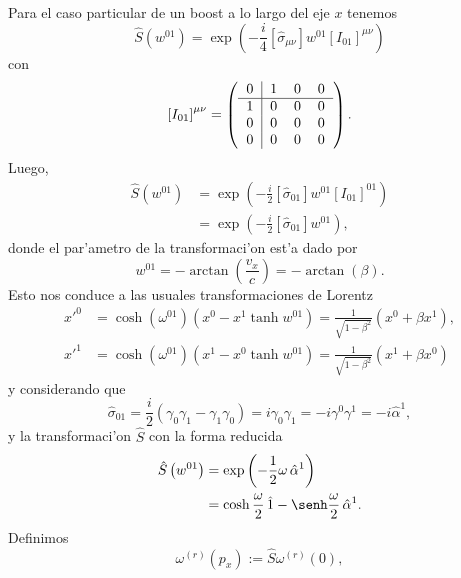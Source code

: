 Para el caso particular de un boost a lo largo del eje $x$ tenemos
\begin{equation}
\hat{S}\left( w^{01}\right) =\exp\left( -\frac{i}{4}\left[
\hat{\sigma}_{\mu\nu}\right]w^{01}\left[ I_{01}\right]
^{\mu\nu}\right)
\end{equation}
con
\begin{equation}
\left[ I_{01}\right]^{\mu\nu}=\left(
\begin{tabular}
[c]{l|lll}%
$0$ & $1$ & $0$ & $0$\\\hline
$1$ & $0$ & $0$ & $0$\\
$0$ & $0$ & $0$ & $0$\\
$0$ & $0$ & $0$ & $0$%
\end{tabular}
\right) .
\end{equation}
Luego,
\begin{align}
\hat{S}\left( w^{01}\right)  & =\exp\left( -\frac{i}{2}\left[
\hat{\sigma}_{01}\right]  w^{01}\left[
I_{01}\right]^{01}\right) \\
& =\exp\left( -\frac{i}{2}\left[ \hat{\sigma}_{01}\right] w^{01}\right),
\end{align}
donde el par'ametro de la transformaci'on est'a dado por
\begin{equation}
w^{01}=-\arctan\left( \frac{v_{x}}{c}\right)=-\arctan(\beta). \label{param}
\end{equation}
Esto nos conduce a las usuales transformaciones de Lorentz
\begin{align}
x'^0 & =\cosh(\omega^{01})\left( x^0-x^1\tanh w^{01}\right)
=\frac{1}{\sqrt{1-\beta^2}}\left( x^0+\beta x^1\right) ,\\
x'^1 & =\cosh(\omega^{01})\left( x^1-x^0\tanh w^{01}\right)
=\frac{1}{\sqrt{1-\beta^2}}\left( x^1+\beta x^0\right)
\end{align}
y considerando que
\begin{equation}
\hat{\sigma}_{01}=\frac{i}{2}\left( \gamma_0\gamma_{1}-\gamma_{1}\gamma
_0\right) =i\gamma_0\gamma_{1}=-i\gamma^0\gamma^1=-i\hat{\alpha}^1,
\end{equation}
y la transformaci'on $\hat{S}$ con la forma reducida
\begin{align}
\hat{S} \left( w^{01}\right)  & =\exp\left( -\frac{1}%
{2}\omega\,\hat{\alpha}^1  \right) \\
& = \cosh\frac{\omega}{2}\,\hat{1}- \senh\frac{\omega}{2}\,\hat{\alpha}^1.
\end{align}
Definimos
\begin{equation}
\omega^{(r)}\left( p_{x}\right) :=\hat{S} \omega^{(r)}(0),
\end{equation}
